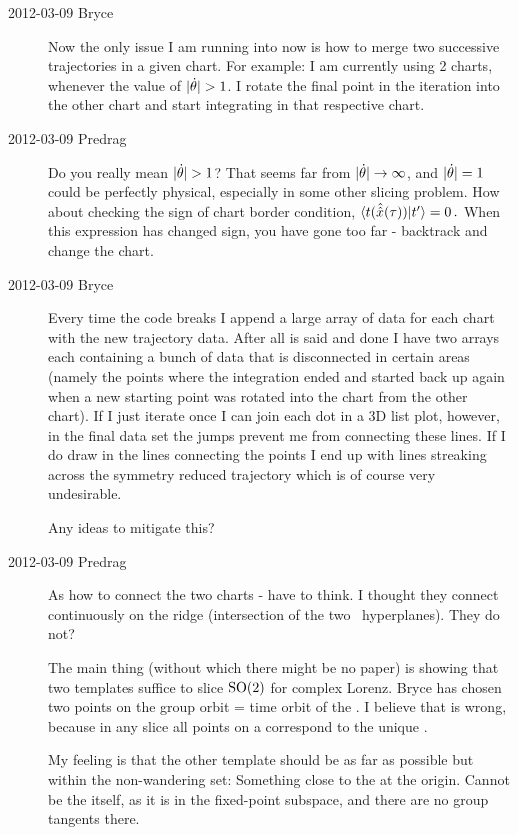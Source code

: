 \begin{description}
\item[2012-03-09 Bryce]
Now the only issue I am running into now is how to merge two successive
trajectories in a given chart. For example: I am currently using 2
charts, whenever the value of  $|\dot{\gSpace}|>1$.  I rotate the final
point in the iteration into the other chart and start integrating in that
respective chart.

\item[2012-03-09 Predrag]
Do you really mean  $|\dot{\gSpace}|>1$? That seems far from $|\dot{\theta}|
\to \infty$, and $|\dot{\theta}|=1$ could be perfectly physical, especially
in some other slicing problem. How about checking the sign of chart
border condition,
\(
\langle{t(\hat{\ensuremath{\hat{x}}}(\ensuremath{\tau}))}\vphantom{ }|\vphantom{}t'\rangle= 0
\,.
\)
When this expression has changed sign, you have gone too far - backtrack
and change the chart.

\item[2012-03-09 Bryce]
Every time the code breaks I append a large array of data for each chart
with the new trajectory data. After all is said and done I have two
arrays each containing a bunch of data that is disconnected in certain
areas (namely the points where the integration ended and started back up
again when a new starting point was rotated into the chart from the other
chart). If I just iterate once I can join each dot in a 3D list plot,
however, in the final data set the jumps prevent me from connecting these
lines. If I do draw in the lines connecting the points I end up with
lines streaking across the symmetry reduced trajectory which is of course
very undesirable.

Any ideas to mitigate this?

\item[2012-03-09 Predrag]
As how to connect the two charts - have to think. I thought they connect
continuously on the ridge (intersection of the two \slice\ hyperplanes).
They do not?

The main thing (without which there might be no paper) is showing that
two templates suffice to slice $\textrm{SO}(2)$ for complex Lorenz. Bryce has chosen
two points on the group orbit = time orbit of the {\reqv}. I
believe that is wrong, because in any slice all points on a
{\reqv} correspond to the unique {\eqv}.

My feeling is that the other template should be as far as possible but
within the non-wandering set: Something close to the {\eqv} at the
origin. Cannot be the {\eqv} itself, as it is in the fixed-point
subspace, and there are no group tangents there.


\end{description}
